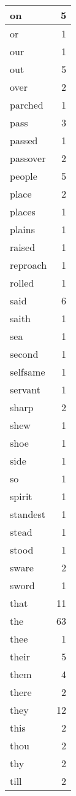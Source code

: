 \begin{center}
\begin{longtable}{l|r}
on & 5 \\ \hline
or & 1 \\ \hline
our & 1 \\ \hline
out & 5 \\ \hline
over & 2 \\ \hline
parched & 1 \\ \hline
pass & 3 \\ \hline
passed & 1 \\ \hline
passover & 2 \\ \hline
people & 5 \\ \hline
place & 2 \\ \hline
places & 1 \\ \hline
plains & 1 \\ \hline
raised & 1 \\ \hline
reproach & 1 \\ \hline
rolled & 1 \\ \hline
said & 6 \\ \hline
saith & 1 \\ \hline
sea & 1 \\ \hline
second & 1 \\ \hline
selfsame & 1 \\ \hline
servant & 1 \\ \hline
sharp & 2 \\ \hline
shew & 1 \\ \hline
shoe & 1 \\ \hline
side & 1 \\ \hline
so & 1 \\ \hline
spirit & 1 \\ \hline
standest & 1 \\ \hline
stead & 1 \\ \hline
stood & 1 \\ \hline
sware & 2 \\ \hline
sword & 1 \\ \hline
that & 11 \\ \hline
the & 63 \\ \hline
thee & 1 \\ \hline
their & 5 \\ \hline
them & 4 \\ \hline
there & 2 \\ \hline
they & 12 \\ \hline
this & 2 \\ \hline
thou & 2 \\ \hline
thy & 2 \\ \hline
till & 2 \\ \hline

\end{longtable}
\end{center}
